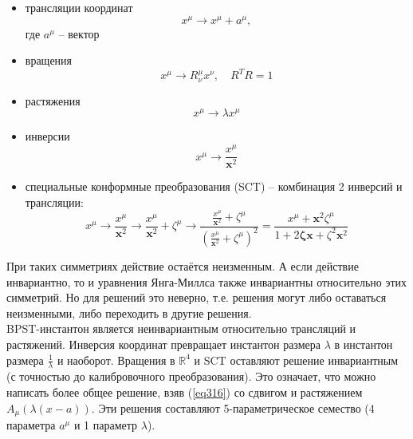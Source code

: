 \documentclass[12pt]{article}
\theoremstyle{definition}
\begin{document}
\begin{itemize}
    \item трансляции координат
    \begin{equation}
        x^\mu\rightarrow x^\mu+a^\mu,
    \end{equation}
    где $a^\mu$ -- вектор
    \item вращения
    \begin{equation}
        x^\mu\rightarrow R^\mu_\nu x^\nu,\quad R^TR=1
    \end{equation}
    \item растяжения
    \begin{equation}
        x^\mu\rightarrow\lambda x^\mu
    \end{equation}
    \item инверсии
    \begin{equation}
        x^\mu\rightarrow\frac{x^\mu}{\bm{x}^2}
    \end{equation}
    \item специальные конформные преобразования (SCT) -- комбинация 2 инверсий и трансляции:
    \begin{equation}
        x^\mu\rightarrow\frac{x^\mu}{\bm{x}^2}\rightarrow\frac{x^\mu}{\bm{x}^2}+\zeta^\mu\rightarrow\frac{\frac{x^\mu}{\bm{x}^2}+\zeta^\mu}{(\frac{x^\mu}{\bm{x}^2}+\zeta^\mu)^2}=\frac{x^\mu+\bm{x}^2\zeta^\mu}{1+2\bm{\zeta}\bm{x}+\zeta^2\bm{x}^2}
    \end{equation}
\end{itemize}
При таких симметриях действие остаётся неизменным. А если действие инвариантно, то и уравнения Янга-Миллса также инвариантны относительно этих симметрий. Но для решений это неверно, т.е. решения могут либо оставаться неизменными, либо переходить в другие решения.\\
BPST-инстантон является неинвариантным относительно трансляций и растяжений. Инверсия координат превращает инстантон размера $\lambda$ в инстантон размера $\frac{1}{\lambda}$ и наоборот. Вращения в $\mathbb{R}^4$ и SCT оставляют решение инвариантным (с точностью до калибровочного преобразования). Это означает, что можно написать более общее решение, взяв (\ref{eq316}) со сдвигом и растяжением $A_\mu(\lambda(x-a))$. Эти решения составляют 5-параметрическое семество (4 параметра $a^\mu$ и 1 параметр $\lambda$).
\end{document}
